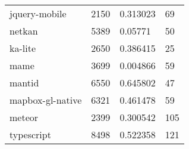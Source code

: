 \begin{table*}[]
\begin{tabular}{llll}
jquery-mobile                        & 2150                               & 0.313023                                                                                                          & 69                                                                                                            \\
netkan                             & 5389                               & 0.05771                                                                                                           & 50                                                                                                            \\
ka-lite                    & 2650                               & 0.386415                                                                                                          & 25                                                                                                            \\
mame                                & 3699                               & 0.004866                                                                                                          & 59                                                                                                            \\
mantid                        & 6550                               & 0.645802                                                                                                          & 47                                                                                                            \\
mapbox-gl-native                     & 6321                               & 0.461478                                                                                                          & 59                                                                                                            \\
meteor                               & 2399                               & 0.300542                                                                                                          & 105                                                                                                           \\
typescript                        & 8498                               & 0.522358                                                                                                          & 121                                                                                                           \\

\end{tabular}
\end{table*}

